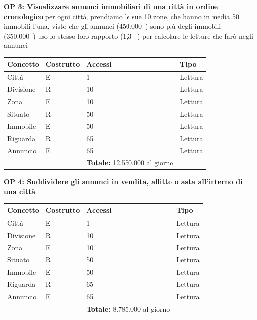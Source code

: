 \documentclass[a4paper,12pt]{report}
\begin{document}
            \textbf{OP 3: Visualizzare annunci immobiliari di una città in ordine cronologico}
            per ogni città, prendiamo le sue 10 zone, che hanno in media 50 immobili l'una, visto che gli annunci (450.000~) sono più degli immobili (350.000~) uso lo stesso loro rapporto (1,3 ~) per calcolare le letture che farò negli annunci
        	\begin{table}[H]
            \centering
             \begin{tabular}{llll}
             \rowcolor{yellow!20} \textbf{Concetto} & \textbf{Costrutto} & \textbf{Accessi} & \textbf{Tipo}\\ [0.5ex] 
             \hline
             Città & E & 1 & Lettura \\ 
             Divisione & R & 10 & Lettura \\ 
             Zona & E & 10 & Lettura \\ 
             Situato & R & 50 & Lettura \\ 
             Immobile & E & 50 & Lettura \\ 
             Riguarda & R & 65 & Lettura \\ 
             Annuncio & E & 65 & Lettura \\ 
             \hline
                \rowcolor{yellow!20} &   & \textbf{Totale:}  12.550.000 al giorno &  \\ [1ex] 
             
             \end{tabular}
            \end{table}

            \textbf{OP 4: Suddividere gli annunci in vendita, affitto o asta all’interno di una città}
        	\begin{table}[H]
            \centering
             \begin{tabular}{llll}
             \rowcolor{yellow!20} \textbf{Concetto} & \textbf{Costrutto} & \textbf{Accessi} & \textbf{Tipo}\\ [0.5ex] 
             \hline
             Città & E & 1 & Lettura \\ 
             Divisione & R & 10 & Lettura \\ 
             Zona & E & 10 & Lettura \\ 
             Situato & R & 50 & Lettura \\ 
             Immobile & E & 50 & Lettura \\ 
             Riguarda & R & 65 & Lettura \\ 
             Annuncio & E & 65 & Lettura \\ 
             \hline
                \rowcolor{yellow!20} &   & \textbf{Totale:}  8.785.000 al giorno &  \\ [1ex] 
             
             \end{tabular}
            \end{table}
\end{document}
